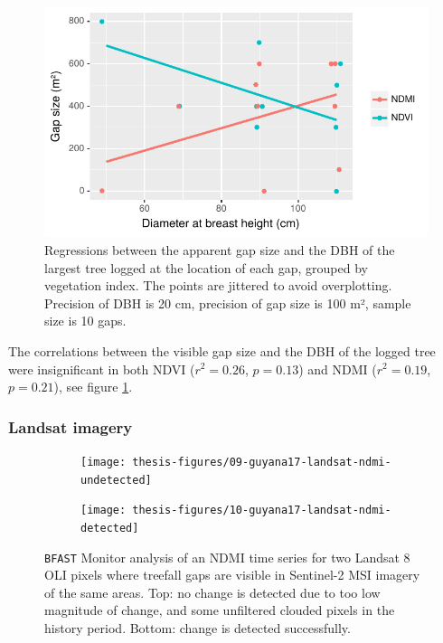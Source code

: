 \documentclass[a4paper,12pt]{scrbook}
\begin{document}
\begin{figure}
  \centering
  \includegraphics{thesis-figures/18-gap-vs-dbh}
  \caption{Regressions between the apparent gap size and the \ac{DBH} of the largest tree logged at the location of each gap, grouped by vegetation index. The points are jittered to avoid overplotting. Precision of \ac{DBH} is 20 cm, precision of gap size is 100 m², sample size is 10 gaps.}
  \label{fig-gap-vs-dbh}
\end{figure}


The correlations between the visible gap size and the \ac{DBH} of the logged tree were insignificant in both NDVI ($r^2=0.26$, $p=0.13$) and NDMI ($r^2=0.19$, $p=0.21$), see figure \ref{fig-gap-vs-dbh}.

\subsubsection{Landsat imagery}

\begin{figure}
  \begin{subfigure}{\textwidth}
    \centering
    \texttt{[image: thesis-figures/09-guyana17-landsat-ndmi-undetected]}
  \end{subfigure}
  \begin{subfigure}{\textwidth}
    \centering
    \texttt{[image: thesis-figures/10-guyana17-landsat-ndmi-detected]}
  \end{subfigure}
  
  \caption{\texttt{BFAST} Monitor analysis of an \ac{NDMI} time series for two Landsat 8 \ac{OLI} pixels where treefall gaps are visible in Sentinel-2 \ac{MSI} imagery of the same areas. Top: no change is detected due to too low magnitude of change, and some unfiltered clouded pixels in the history period. Bottom: change is detected successfully.}
  \label{fig-guyana17-landsat-ndmi}
\end{figure}
\end{document}
